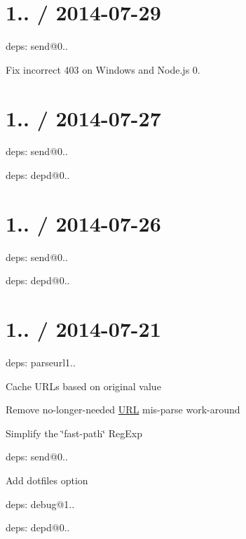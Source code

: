 \section*{1.. / 2014-\/07-\/29 }


\begin{DoxyItemize}
\item deps\+: send@0..
\begin{DoxyItemize}
\item Fix incorrect 403 on Windows and Node.\+js 0.
\end{DoxyItemize}
\end{DoxyItemize}

\section*{1.. / 2014-\/07-\/27 }


\begin{DoxyItemize}
\item deps\+: send@0..
\begin{DoxyItemize}
\item deps\+: depd@0..
\end{DoxyItemize}
\end{DoxyItemize}

\section*{1.. / 2014-\/07-\/26 }


\begin{DoxyItemize}
\item deps\+: send@0..
\begin{DoxyItemize}
\item deps\+: depd@0..
\end{DoxyItemize}
\end{DoxyItemize}

\section*{1.. / 2014-\/07-\/21 }


\begin{DoxyItemize}
\item deps\+: parseurl1..
\begin{DoxyItemize}
\item Cache U\+R\+Ls based on original value
\item Remove no-\/longer-\/needed \hyperlink{struct_u_r_l}{U\+R\+L} mis-\/parse work-\/around
\item Simplify the \char`\"{}fast-\/path\char`\"{} {\ttfamily Reg\+Exp}
\end{DoxyItemize}
\item deps\+: send@0..
\begin{DoxyItemize}
\item Add {\ttfamily dotfiles} option
\item deps\+: debug@1..
\item deps\+: depd@0..
\end{DoxyItemize}
\end{DoxyItemize}

